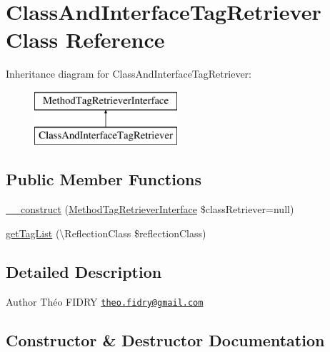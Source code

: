 \hypertarget{class_prophecy_1_1_php_documentor_1_1_class_and_interface_tag_retriever}{}\section{Class\+And\+Interface\+Tag\+Retriever Class Reference}
\label{class_prophecy_1_1_php_documentor_1_1_class_and_interface_tag_retriever}
Inheritance diagram for Class\+And\+Interface\+Tag\+Retriever\+:\begin{figure}[H]
\begin{center}
\leavevmode
\includegraphics[height=2.000000cm]{class_prophecy_1_1_php_documentor_1_1_class_and_interface_tag_retriever}
\end{center}
\end{figure}
\subsection*{Public Member Functions}
\begin{DoxyCompactItemize}
\item 
\mbox{\hyperlink{class_prophecy_1_1_php_documentor_1_1_class_and_interface_tag_retriever_ad2b0000efcdf6cfbc30f85ea1a657c6c}{\+\_\+\+\_\+construct}} (\mbox{\hyperlink{interface_prophecy_1_1_php_documentor_1_1_method_tag_retriever_interface}{Method\+Tag\+Retriever\+Interface}} \$class\+Retriever=null)
\item 
\mbox{\hyperlink{class_prophecy_1_1_php_documentor_1_1_class_and_interface_tag_retriever_a2eb68ce00dcc84a156b9a2b7844a5e6f}{get\+Tag\+List}} (\textbackslash{}Reflection\+Class \$reflection\+Class)
\end{DoxyCompactItemize}


\subsection{Detailed Description}
\begin{DoxyAuthor}{Author}
Théo F\+I\+D\+RY \href{mailto:theo.fidry@gmail.com}{\tt theo.\+fidry@gmail.\+com} 
\end{DoxyAuthor}


\subsection{Constructor \& Destructor Documentation}
\mbox{\label{class_prophecy_1_1_php_documentor_1_1_class_and_interface_tag_retriever_ad2b0000efcdf6cfbc30f85ea1a657c6c}} 
